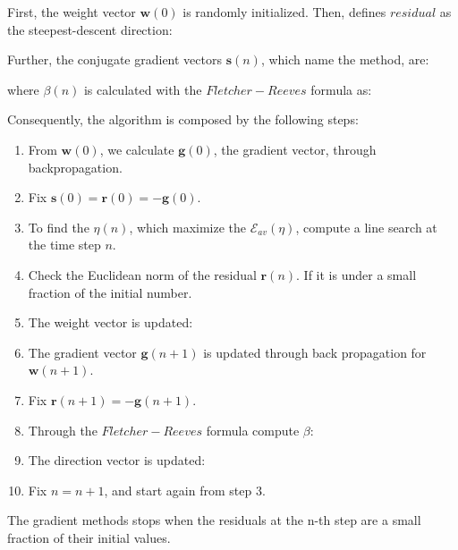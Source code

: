 First, the weight vector $\mathbf{w}(0)$ is randomly initialized. 
Then, \citet {RefWorks:158} defines $residual$ as the steepest-descent
direction:

Further, the conjugate gradient vectors $\mathbf{s}(n)$, which name the method,
are:

where $\beta(n)$ is calculated with the $Fletcher-Reeves$ formula as:

Consequently, the algorithm is composed by the following steps:
\begin{enumerate}
  \item{From $\mathbf{w}(0)$, we calculate $\mathbf{g}(0)$, the gradient
  vector, through backpropagation.}
  \item{Fix $\mathbf{s}(0) = \mathbf{r}(0) = - \mathbf{g}(0)$.}
  \item{To find the $\eta(n)$, which maximize the $\mathscr{E}_{av}(\eta)$,
  compute a line search at the time step $n$.}
  \item{Check the Euclidean norm of the residual $\mathbf{r}(n)$. If it is
  under a small fraction of the initial number.}
  \item{The weight vector is updated:
  
  } 
  \item{The gradient vector $\mathbf{g}(n + 1)$ is updated through back
  propagation for $\mathbf{w}(n + 1)$.}
  \item{Fix $\mathbf{r}(n + 1) = - \mathbf{g}(n + 1)$.}
  \item{Through the $Fletcher-Reeves$ formula compute $\beta$:
  
  }
  \item{The direction vector is updated:
  
  }
  \item{Fix $ n = n + 1$, and start again from step 3.}   
\end{enumerate}
% 
% 
The gradient methods stops when the residuals at the n-th step are a small
fraction of their initial values.



